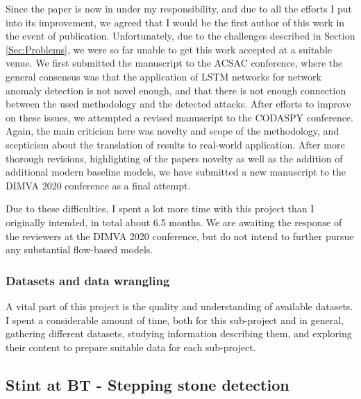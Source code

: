 \documentclass[a4paper,12pt,twoside]{article}
\begin{document}
Since the paper is now in under my responsibility, and due to all the efforts I put into its improvement, we agreed that I would be the first author of this work in the event of publication. Unfortunately, due to the challenges described in Section \ref{Sec:Problems}, we were so far unable to get this work accepted at a suitable venue. We first submitted the manuscript to the ACSAC conference, where the general consensus was that the application of LSTM networks for network anomaly detection is not novel enough, and that there is not enough connection between the used methodology and the detected attacks.
After efforts to improve on these issues, we attempted a revised manuscript to the CODASPY conference. Again, the main criticism here was novelty and scope of the methodology, and scepticism about the translation of results to real-world application. After more thorough revisions, highlighting of the papers novelty as well as the addition of additional modern baseline models, we have submitted a new manuscript to the DIMVA 2020 conference as a final attempt. 

Due to these difficulties, I spent a lot more time with this project than I originally intended, in total about 6.5 months. We are awaiting the response of the reviewers at the DIMVA 2020 conference, but do not intend to further pursue any substantial flow-based models.

\subsubsection{Datasets and data wrangling} 
 
A vital part of this project is the quality and understanding of available datasets. I spent a considerable amount of time, both for this sub-project and in general, gathering different datasets, studying information describing them, and exploring their content to prepare suitable data for each sub-project.


\subsection{Stint at BT - Stepping stone detection}\label{Sec:BTstint}

\end{document}

